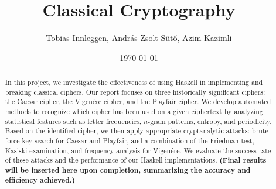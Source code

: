 \documentclass[12pt,a4paper]{article}
\title{Classical Cryptography}
\author{Tobias Innleggen, András Zsolt Sütő, Azim Kazimli}
\date{\today}
\begin{document}
\maketitle


\begin{abstract}
    In this project, we investigate the effectiveness of using Haskell
     in implementing and breaking classical ciphers. Our report focuses on three historically significant ciphers: the Caesar cipher, 
    the Vigenére cipher, and the Playfair cipher. We develop automated methods to recognize which cipher has been used on a given ciphertext by analyzing statistical 
    features such as letter frequencies, $n$-gram patterns, entropy, and periodicity. Based on the identified cipher, we then apply appropriate cryptanalytic attacks: 
    brute-force key search for Caesar and Playfair, and a combination of the Friedman test, Kasiski examination, and frequency analysis for Vigenére. We evaluate the
     success rate of these attacks and the performance of our Haskell implementations. 
      \textbf{(Final results will be inserted here upon completion, summarizing the accuracy and efficiency achieved.)}
    \end{abstract}
\vfill

\tableofcontents

\clearpage






















\end{document}
